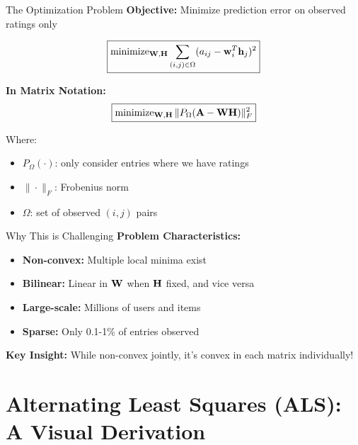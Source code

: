 \documentclass{beamer}
\begin{document}
\begin{frame}{The Optimization Problem}
\textbf{Objective:} Minimize prediction error on observed ratings only

\pause
\begin{equation*}
\boxed{\operatorname{minimize}_{\mathbf{W},\mathbf{H}} \sum_{(i,j) \in \Omega} (a_{ij} - \mathbf{w}_i^T \mathbf{h}_j)^2}
\end{equation*}

\pause
\textbf{In Matrix Notation:}
\begin{equation*}
\boxed{\operatorname{minimize}_{\mathbf{W},\mathbf{H}} \|P_\Omega(\mathbf{A} - \mathbf{W}\mathbf{H})\|_F^2}
\end{equation*}

\pause
Where:
\begin{itemize}[<+->]
    \item $P_\Omega(\cdot)$: only consider entries where we have ratings
    \item $\|\cdot\|_F$: Frobenius norm
    \item $\Omega$: set of observed $(i,j)$ pairs
\end{itemize}
\end{frame}

\begin{frame}{Why This is Challenging}
\textbf{Problem Characteristics:}
\begin{itemize}[<+->]
    \item \textbf{Non-convex:} Multiple local minima exist
    \item \textbf{Bilinear:} Linear in $\mathbf{W}$ when $\mathbf{H}$ fixed, and vice versa
    \item \textbf{Large-scale:} Millions of users and items
    \item \textbf{Sparse:} Only 0.1-1\% of entries observed
\end{itemize}

\pause
\textbf{Key Insight:} While non-convex jointly, it's convex in each matrix individually!
\end{frame}


\section{Alternating Least Squares (ALS): A Visual Derivation}
\end{document}
